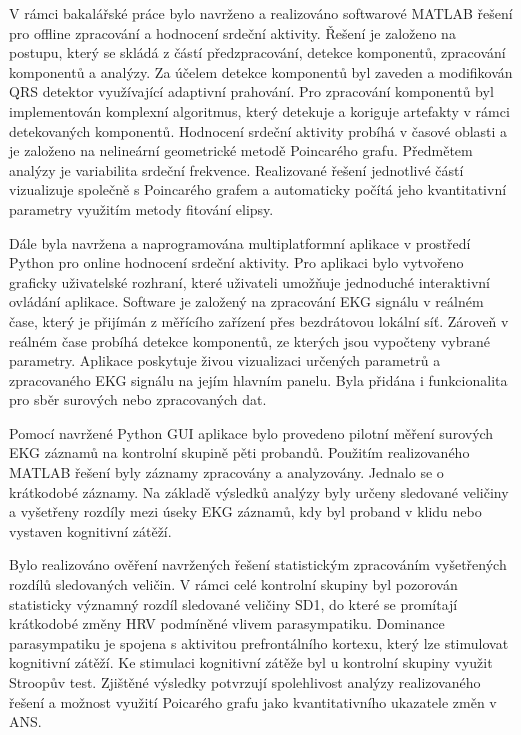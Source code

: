 V rámci bakalářské práce bylo navrženo a realizováno softwarové MATLAB
řešení pro offline zpracování a hodnocení srdeční aktivity. Řešení je založeno
na postupu, který se skládá z částí předzpracování, detekce komponentů,
zpracování komponentů a analýzy. Za účelem detekce komponentů byl zaveden a
modifikován QRS detektor využívající adaptivní prahování. Pro zpracování
komponentů byl implementován komplexní algoritmus, který detekuje a koriguje
artefakty v rámci detekovaných komponentů. Hodnocení srdeční aktivity probíhá v
časové oblasti a je založeno na nelineární geometrické metodě Poincarého grafu.
Předmětem analýzy je variabilita srdeční frekvence. Realizované řešení
jednotlivé částí vizualizuje společně s Poincarého grafem a automaticky počítá
jeho kvantitativní parametry využitím metody fitování elipsy. 

Dále byla navržena a naprogramována multiplatformní aplikace v prostředí Python
pro online hodnocení srdeční aktivity. Pro aplikaci bylo vytvořeno graficky
uživatelské rozhraní, které uživateli umožňuje jednoduché interaktivní ovládání
aplikace. Software je založený na zpracování EKG signálu v reálném čase, který
je přijímán z měřícího zařízení přes bezdrátovou lokální síť. Zároveň v reálném
čase probíhá detekce komponentů, ze kterých jsou vypočteny vybrané parametry.
Aplikace poskytuje živou vizualizaci určených parametrů a zpracovaného EKG
signálu na jejím hlavním panelu. Byla přidána i funkcionalita pro sběr surových
nebo zpracovaných dat.

Pomocí navržené Python GUI aplikace bylo provedeno pilotní měření surových EKG
záznamů na kontrolní skupině pěti probandů. Použitím realizovaného MATLAB řešení
byly záznamy zpracovány a analyzovány. Jednalo se o krátkodobé záznamy. Na
základě výsledků analýzy byly určeny sledované veličiny a vyšetřeny rozdíly mezi
úseky EKG záznamů, kdy byl proband v klidu nebo vystaven kognitivní zátěží. 

Bylo realizováno ověření navržených řešení statistickým zpracováním vyšetřených
rozdílů sledovaných veličin. V rámci celé kontrolní skupiny byl pozorován
statisticky významný rozdíl sledované veličiny SD1, do které se promítají
krátkodobé změny HRV podmíněné vlivem parasympatiku. Dominance parasympatiku je
spojena s aktivitou prefrontálního kortexu, který lze stimulovat kognitivní
zátěží. Ke stimulaci kognitivní zátěže byl u kontrolní skupiny využit Stroopův
test. Zjištěné výsledky potvrzují spolehlivost analýzy realizovaného řešení a
možnost využití Poicarého grafu jako kvantitativního ukazatele změn v ANS. 


